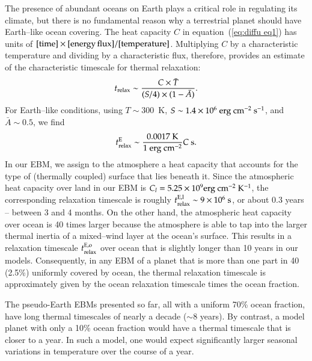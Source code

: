 The presence of abundant oceans on Earth plays a critical role in
regulating its climate, but there is no fundamental reason why a
terrestrial planet should have Earth--like ocean covering.  The heat
capacity $C$ in equation~(\ref{eq:diffu eq1}) has units of $\rm
[time]\times[energy\,flux]/[temperature]$.  Multiplying $C$ by a
characteristic temperature and dividing by a characteristic flux,
therefore, provides an estimate of the characteristic timescale for
thermal relaxation:
\begin{equation}
t_{\rm relax} \sim \frac{C \times \bar{T}}{(S/4)\times (1-\bar{A})}.
\label{eq:t_relax}
\end{equation}
For Earth--like conditions, using $T\sim 300$~K, $S\sim1.4\times
10^{6}{\rm~erg~cm^{-2}~s^{-1}}$, and $\bar{A} \sim 0.5$, we find
\begin{equation}
t^{\rm E}_{\rm relax} \sim  \frac{0.0017 {\rm~K}}{1 {\rm~erg~cm^{-2}}} C {\rm~s}.
\label{eq:t_relax earth}
\end{equation}
In our EBM, we assign to the atmosphere a heat capacity that accounts
for the type of (thermally coupled) surface that lies beneath it.
Since the atmospheric heat capacity over land in our EBM is $C_l =
5.25\times10^9 {\rm erg~cm^{-2}~K^{-1}}$, the corresponding relaxation
timescale is roughly $t^{\rm E,l}_{\rm relax}\sim 9\times10^6{\rm~s}$,
or about 0.3 years -- between 3 and 4 months.  On the other hand, the
atmospheric heat capacity over ocean is 40 times larger because the
atmosphere is able to tap into the larger thermal inertia of a
mixed--wind layer at the ocean's surface. This results in a relaxation
timescale $t^{\rm E,o}_{\rm relax}$ over ocean that is slightly longer
than 10 years in our models.  Consequently, in any EBM of a planet
that is more than one part in 40 (2.5\%) uniformly covered by ocean,
the thermal relaxation timescale is approximately given by the ocean
relaxation timescale times the ocean fraction.

The pseudo-Earth EBMs presented so far, all with a uniform 70\% ocean
fraction, have long thermal timescales of nearly a decade ($\sim 8$
years).  By contrast, a model planet with only a 10\% ocean fraction
would have a thermal timescale that is closer to a year.  In such a
model, one would expect significantly larger seasonal variations in
temperature over the course of a year.

